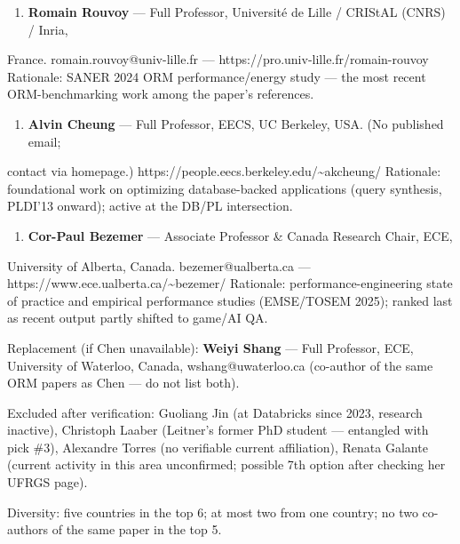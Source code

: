 \documentclass[11pt,a4paper]{article}
\begin{document}
\begin{enumerate}
  \item \textbf{Romain Rouvoy} --- Full Professor, Université de Lille / CRIStAL (CNRS) / Inria,
\end{enumerate}

France. romain.rouvoy@univ-lille.fr --- https://pro.univ-lille.fr/romain-rouvoy Rationale: SANER 2024 ORM performance/energy study --- the most recent ORM-benchmarking work among the paper's references.

\begin{enumerate}
  \item \textbf{Alvin Cheung} --- Full Professor, EECS, UC Berkeley, USA. (No published email;
\end{enumerate}

contact via homepage.) https://people.eecs.berkeley.edu/\textasciitilde{}akcheung/ Rationale: foundational work on optimizing database-backed applications (query synthesis, PLDI'13 onward); active at the DB/PL intersection.

\begin{enumerate}
  \item \textbf{Cor-Paul Bezemer} --- Associate Professor \& Canada Research Chair, ECE,
\end{enumerate}

University of Alberta, Canada. bezemer@ualberta.ca --- https://www.ece.ualberta.ca/\textasciitilde{}bezemer/ Rationale: performance-engineering state of practice and empirical performance studies (EMSE/TOSEM 2025); ranked last as recent output partly shifted to game/AI QA.

Replacement (if Chen unavailable): \textbf{Weiyi Shang} --- Full Professor, ECE, University of Waterloo, Canada, wshang@uwaterloo.ca (co-author of the same ORM papers as Chen --- do not list both).

Excluded after verification: Guoliang Jin (at Databricks since 2023, research inactive), Christoph Laaber (Leitner's former PhD student --- entangled with pick \#3), Alexandre Torres (no verifiable current affiliation), Renata Galante (current activity in this area unconfirmed; possible 7th option after checking her UFRGS page).

Diversity: five countries in the top 6; at most two from one country; no two co-authors of the same paper in the top 5.
\end{document}
